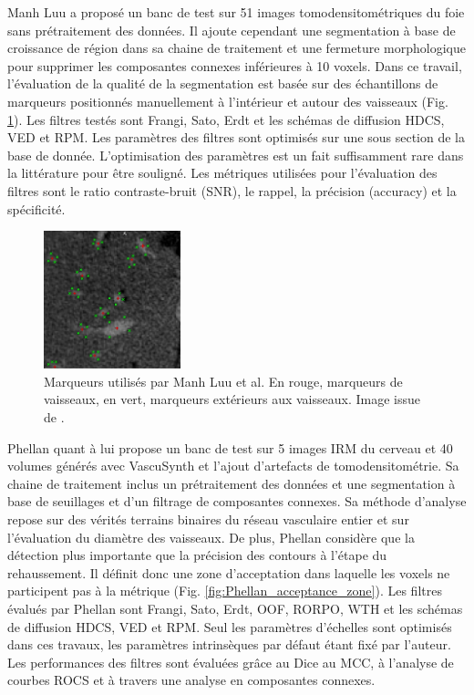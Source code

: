 Manh Luu a proposé un banc de test sur 51 images tomodensitométriques du foie sans prétraitement des données. Il ajoute cependant une segmentation à base de croissance de région dans sa chaine de traitement et une fermeture morphologique pour supprimer les composantes connexes inférieures à 10 voxels. Dans ce travail, l'évaluation de la qualité de la segmentation est basée sur des échantillons de marqueurs positionnés manuellement à l'intérieur et autour des vaisseaux (Fig. \ref{fig:ManhLuu_markers}). Les filtres testés sont Frangi, Sato, Erdt et les schémas de diffusion HDCS, VED et RPM. Les paramètres des filtres sont optimisés sur une sous section de la base de donnée. L'optimisation des paramètres est un fait suffisamment rare dans la littérature pour être souligné. Les métriques utilisées pour l'évaluation des filtres sont le ratio contraste-bruit (SNR), le rappel, la précision (accuracy) et la spécificité.

\begin{figure}[h]
  \centering
  \includegraphics[height=4cm]{Images/ManhLuu_markers.png}
  \caption{Marqueurs utilisés par Manh Luu et al. En rouge, marqueurs de vaisseaux, en vert, marqueurs extérieurs aux vaisseaux. Image issue de \cite{Luu2015_liver_vesselness_comparison}. }
  \label{fig:ManhLuu_markers}
\end{figure}

Phellan quant à lui propose un banc de test sur 5 images IRM du cerveau et 40 volumes générés avec VascuSynth et l'ajout d'artefacts de tomodensitométrie. Sa chaine de traitement inclus un prétraitement des données et une segmentation à base de seuillages et d'un filtrage de composantes connexes. Sa méthode d'analyse repose sur des vérités terrains binaires du réseau vasculaire entier et sur l'évaluation du diamètre des vaisseaux. De plus, Phellan considère que la détection plus importante que la précision des contours à l'étape du rehaussement. Il définit donc une zone d'acceptation dans laquelle les voxels ne participent pas à la métrique (Fig. \ref{fig:Phellan_acceptance_zone}). Les filtres évalués par Phellan sont Frangi, Sato, Erdt, OOF, RORPO, WTH et les schémas de diffusion HDCS, VED et RPM. Seul les paramètres d'échelles sont optimisés dans ces travaux, les paramètres intrinsèques par défaut étant fixé par l'auteur. Les performances des filtres sont évaluées grâce au Dice au MCC, à l'analyse de courbes ROCS et à travers une analyse en composantes connexes.


